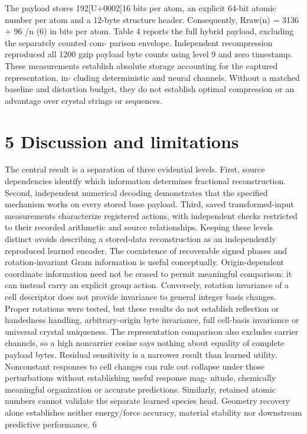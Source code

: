 \documentclass[11pt]{article}
\begin{document}
The payload stores 192[U+0002]16 bits per atom, an explicit 64-bit atomic number per atom and a 12-byte
structure header. Consequently,
Rraw(n) = 3136 + 96 /n (6)
in bits per atom. Table 4 reports the full hybrid payload, excluding the separately counted com-
parison envelope. Independent recompression reproduced all 1200 gzip payload byte counts using
level 9 and zero timestamp.
These measurements establish absolute storage accounting for the captured representation, in-
cluding deterministic and neural channels. Without a matched baseline and distortion budget, they
do not establish optimal compression or an advantage over crystal strings or sequences.

\section*{5 Discussion and limitations}

The central result is a separation of three evidential levels. First, source dependencies identify
which information determines fractional reconstruction. Second, independent numerical decoding
demonstrates that the specified mechanism works on every stored base payload. Third, saved
transformed-input measurements characterize registered actions, with independent checks restricted
to their recorded arithmetic and source relationships. Keeping these levels distinct avoids describing
a stored-data reconstruction as an independently reproduced learned encoder.
The coexistence of recoverable signed phases and rotation-invariant Gram information is useful
conceptually. Origin-dependent coordinate information need not be erased to permit meaningful
comparison: it can instead carry an explicit group action. Conversely, rotation invariance of a
cell descriptor does not provide invariance to general integer basis changes. Proper rotations were
tested, but these results do not establish reflection or handedness handling, arbitrary-origin byte
invariance, full cell-basis invariance or universal crystal uniqueness. The representation comparison
also excludes carrier channels, so a high noncarrier cosine says nothing about equality of complete
payload bytes.
Residual sensitivity is a narrower result than learned utility. Nonconstant responses to cell
changes can rule out collapse under those perturbations without establishing useful response mag-
nitude, chemically meaningful organization or accurate predictions. Similarly, retained atomic
numbers cannot validate the separate learned species head. Geometry recovery alone establishes
neither energy/force accuracy, material stability nor downstream predictive performance.
6
\end{document}
